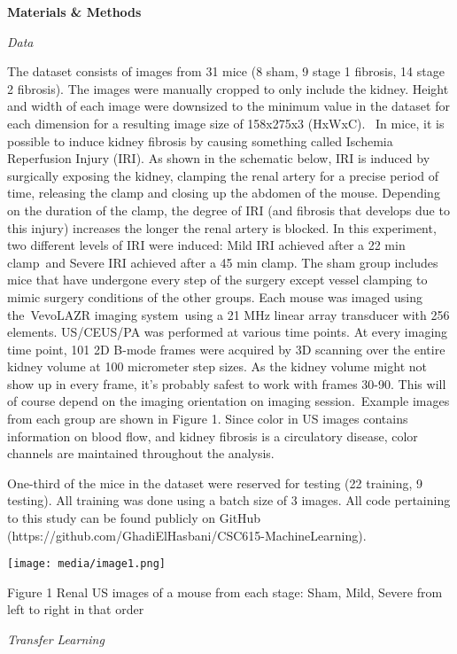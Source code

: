 \documentclass[
]{article}
\begin{document}
\textbf{Materials \& Methods}

\emph{Data}

The dataset consists of images from 31 mice (8 sham, 9 stage 1 fibrosis,
14 stage 2 fibrosis). The images were manually cropped to only include
the kidney. Height and width of each image were downsized to the minimum
value in the dataset for each dimension for a resulting image size of
158x275x3 (HxWxC). ~In mice, it is possible to induce kidney fibrosis by
causing something called Ischemia Reperfusion Injury (IRI). As shown in
the schematic below, IRI is induced by surgically exposing the kidney,
clamping the renal artery for a precise period of time, releasing the
clamp and closing up the abdomen of the mouse. Depending on the duration
of the clamp, the degree of IRI (and fibrosis that develops due to this
injury) increases the longer the renal artery is blocked. In this
experiment, two different levels of IRI were induced: Mild IRI achieved
after a 22 min clamp~and Severe IRI achieved after a 45 min clamp. The
sham group includes mice that have undergone every step of the surgery
except vessel clamping to mimic surgery conditions of the other groups.
Each mouse was imaged using the~VevoLAZR imaging system~using a 21 MHz
linear array transducer with 256 elements. US/CEUS/PA was performed at
various time points. At every imaging time point, 101 2D B-mode frames
were acquired by 3D scanning over the entire kidney volume at 100
micrometer step sizes. As the kidney volume might not show up in every
frame, it's probably safest to work with frames 30-90. This will of
course depend on the imaging orientation on imaging session.~Example
images from each group are shown in Figure 1. Since color in US images
contains information on blood flow, and kidney fibrosis is a circulatory
disease, color channels are maintained throughout the analysis.

One-third of the mice in the dataset were reserved for testing (22
training, 9 testing). All training was done using a batch size of 3
images. All code pertaining to this study can be found publicly on
GitHub (https://github.com/GhadiElHasbani/CSC615-MachineLearning).

\texttt{[image: media/image1.png]}

Figure 1 Renal US images of a mouse from each stage: Sham, Mild, Severe
from left to right in that order

\emph{Transfer Learning}
\end{document}
